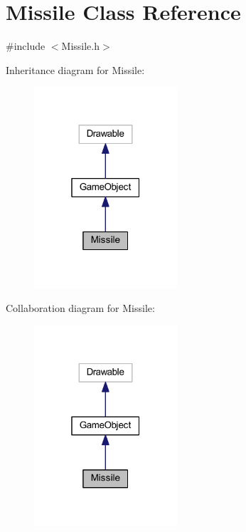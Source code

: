 \hypertarget{class_missile}{}\section{Missile Class Reference}
\label{class_missile}


{\ttfamily \#include $<$Missile.\+h$>$}



Inheritance diagram for Missile\+:
\nopagebreak
\begin{figure}[H]
\begin{center}
\leavevmode
\includegraphics[width=151pt]{class_missile__inherit__graph}
\end{center}
\end{figure}


Collaboration diagram for Missile\+:
\nopagebreak
\begin{figure}[H]
\begin{center}
\leavevmode
\includegraphics[width=151pt]{class_missile__coll__graph}
\end{center}
\end{figure}
